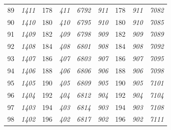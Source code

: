 \documentclass[10pt,fleqn]{article}
\begin{document}
\begin{longtable}{c|cccccccc}
89 & {\color{blue} \it 1411 \rm} & {\color{black} 178} & {\color{blue} \it 411 \rm} & {\color{blue} \it 6792 \rm} & {\color{blue} \it 911 \rm} & {\color{black} 178} & {\color{blue} \it 911 \rm} & {\color{blue} \it 7082 \rm} \\
90 & {\color{blue} \it 1410 \rm} & {\color{black} 180} & {\color{blue} \it 410 \rm} & {\color{blue} \it 6795 \rm} & {\color{blue} \it 910 \rm} & {\color{black} 180} & {\color{blue} \it 910 \rm} & {\color{blue} \it 7085 \rm} \\
91 & {\color{blue} \it 1409 \rm} & {\color{black} 182} & {\color{blue} \it 409 \rm} & {\color{blue} \it 6798 \rm} & {\color{blue} \it 909 \rm} & {\color{black} 182} & {\color{blue} \it 909 \rm} & {\color{blue} \it 7089 \rm} \\
92 & {\color{blue} \it 1408 \rm} & {\color{black} 184} & {\color{blue} \it 408 \rm} & {\color{blue} \it 6801 \rm} & {\color{blue} \it 908 \rm} & {\color{black} 184} & {\color{blue} \it 908 \rm} & {\color{blue} \it 7092 \rm} \\
93 & {\color{blue} \it 1407 \rm} & {\color{black} 186} & {\color{blue} \it 407 \rm} & {\color{blue} \it 6803 \rm} & {\color{blue} \it 907 \rm} & {\color{black} 186} & {\color{blue} \it 907 \rm} & {\color{blue} \it 7095 \rm} \\
94 & {\color{blue} \it 1406 \rm} & {\color{black} 188} & {\color{blue} \it 406 \rm} & {\color{blue} \it 6806 \rm} & {\color{blue} \it 906 \rm} & {\color{black} 188} & {\color{blue} \it 906 \rm} & {\color{blue} \it 7098 \rm} \\
95 & {\color{blue} \it 1405 \rm} & {\color{black} 190} & {\color{blue} \it 405 \rm} & {\color{blue} \it 6809 \rm} & {\color{blue} \it 905 \rm} & {\color{black} 190} & {\color{blue} \it 905 \rm} & {\color{blue} \it 7101 \rm} \\
96 & {\color{blue} \it 1404 \rm} & {\color{black} 192} & {\color{blue} \it 404 \rm} & {\color{blue} \it 6812 \rm} & {\color{blue} \it 904 \rm} & {\color{black} 192} & {\color{blue} \it 904 \rm} & {\color{blue} \it 7104 \rm} \\
97 & {\color{blue} \it 1403 \rm} & {\color{black} 194} & {\color{blue} \it 403 \rm} & {\color{blue} \it 6814 \rm} & {\color{blue} \it 903 \rm} & {\color{black} 194} & {\color{blue} \it 903 \rm} & {\color{blue} \it 7108 \rm} \\
98 & {\color{blue} \it 1402 \rm} & {\color{black} 196} & {\color{blue} \it 402 \rm} & {\color{blue} \it 6817 \rm} & {\color{blue} \it 902 \rm} & {\color{black} 196} & {\color{blue} \it 902 \rm} & {\color{blue} \it 7111 \rm} \\

\end{longtable}
\end{document}
